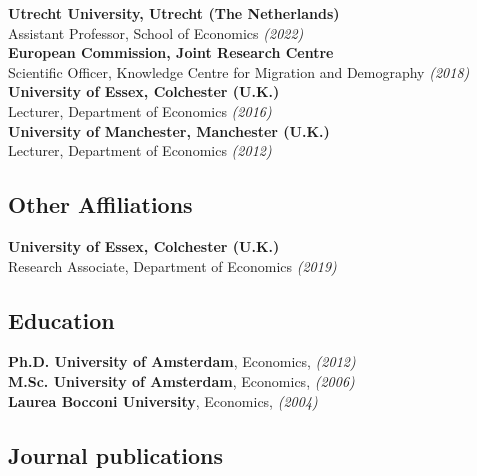 \documentclass[11pt]{article}
\begin{document}
\hspace{20pt}\textbf{Utrecht University, Utrecht (The Netherlands)}\\
\hspace*{27pt}Assistant Professor, School of Economics \emph{(2022\textendash)}\\
\hspace*{20pt}\textbf{European Commission, Joint Research Centre}\\
\hspace*{27pt}Scientific Officer, Knowledge Centre for Migration and Demography \emph{(2018)}\\
\hspace*{20pt}\textbf{University of Essex, Colchester (U.K.)}\\
\hspace*{27pt}Lecturer, Department of Economics \emph{(2016)}\\
\hspace*{20pt}\textbf{University of Manchester, Manchester (U.K.)}\\
\hspace*{27pt}Lecturer, Department of Economics \emph{(2012)}

\subsection*{\sc Other Affiliations}
\hspace{20pt}\textbf{University of Essex, Colchester (U.K.)}\\
\hspace*{27pt}Research Associate, Department of Economics \emph{(2019\textendash )}

\subsection*{\sc Education}

\hspace*{20pt}\textbf{Ph.D. University of Amsterdam}, Economics, \emph{(2012)} \\
\hspace*{20pt}\textbf{M.Sc. University of Amsterdam}, Economics,  \emph{(2006)} \\
\hspace*{20pt}\textbf{Laurea Bocconi University}, Economics, \emph{ (2004)}

\subsection*{\sc Journal publications}
\end{document}
